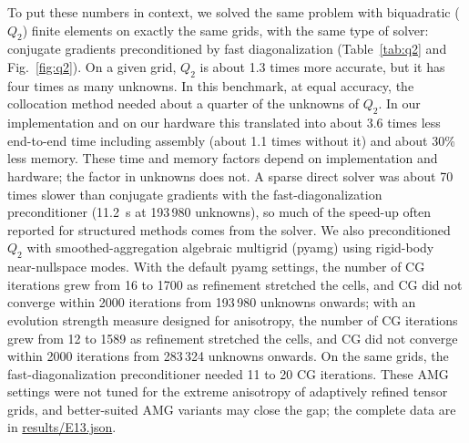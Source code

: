 \documentclass[smallextended,envcountsame]{svjour3}
\begin{document}
To put these numbers in context, we solved the same problem with biquadratic ($Q_2$) finite elements on
exactly the same grids, with the same type of solver: conjugate gradients preconditioned by fast
diagonalization (Table~\ref{tab:q2} and Fig.~\ref{fig:q2}). On a given grid, $Q_2$ is about 1.3 times more
accurate, but it has four times as many unknowns. In this benchmark, at equal accuracy, the collocation method needed about a quarter of the unknowns of $Q_2$. In our implementation and on our hardware this translated into about 3.6 times less end-to-end time
including assembly (about 1.1 times without it) and about 30\% less memory. These time and memory factors depend on implementation and
hardware; the factor in unknowns does not. A sparse direct solver was about 70 times slower than conjugate gradients with the
fast-diagonalization preconditioner (11.2~s at 193\,980 unknowns), so much of the speed-up often reported for structured methods comes from the
solver. We also preconditioned $Q_2$ with smoothed-aggregation algebraic multigrid (pyamg) using rigid-body near-nullspace modes. With the default pyamg settings, the number of CG iterations grew from 16 to 1700 as refinement stretched the cells, and CG did not converge within 2000 iterations from 193\,980 unknowns onwards; with an evolution strength measure designed for anisotropy, the number of CG iterations grew from 12 to 1589 as refinement stretched the cells, and CG did not converge within 2000 iterations from 283\,324 unknowns onwards. On the same grids, the fast-diagonalization preconditioner needed 11 to 20 CG iterations. These AMG settings were not tuned for the extreme anisotropy of adaptively refined tensor grids, and better-suited AMG variants may close the gap; the complete data are in \url{results/E13.json}.
\end{document}
